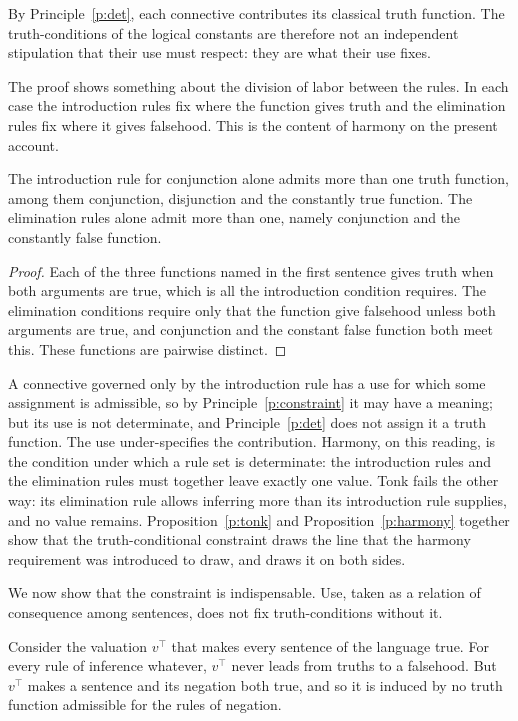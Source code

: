 \documentclass{situationist-preprint}
\begin{document}
By Principle~\ref{p:det}, each connective contributes its classical truth function. The truth-conditions of the logical constants are therefore not an independent stipulation that their use must respect: they are what their use fixes.

The proof shows something about the division of labor between the rules. In each case the introduction rules fix where the function gives truth and the elimination rules fix where it gives falsehood. This is the content of harmony on the present account.

\begin{proposition}[Harmony]\label{p:harmony}
The introduction rule for conjunction alone admits more than one truth function, among them conjunction, disjunction and the constantly true function. The elimination rules alone admit more than one, namely conjunction and the constantly false function.
\end{proposition}

\begin{proof}
Each of the three functions named in the first sentence gives truth when both arguments are true, which is all the introduction condition requires. The elimination conditions require only that the function give falsehood unless both arguments are true, and conjunction and the constant false function both meet this. These functions are pairwise distinct.
\end{proof}

A connective governed only by the introduction rule has a use for which some assignment is admissible, so by Principle~\ref{p:constraint} it may have a meaning; but its use is not determinate, and Principle~\ref{p:det} does not assign it a truth function. The use under-specifies the contribution. Harmony, on this reading, is the condition under which a rule set is determinate: the introduction rules and the elimination rules must together leave exactly one value. Tonk fails the other way: its elimination rule allows inferring more than its introduction rule supplies, and no value remains. Proposition~\ref{p:tonk} and Proposition~\ref{p:harmony} together show that the truth-conditional constraint draws the line that the harmony requirement was introduced to draw, and draws it on both sides.

We now show that the constraint is indispensable. Use, taken as a relation of consequence among sentences, does not fix truth-conditions without it.

\begin{proposition}\label{p:carnap}
Consider the valuation $v^\top$ that makes every sentence of the language true. For every rule of inference whatever, $v^\top$ never leads from truths to a falsehood. But $v^\top$ makes a sentence and its negation both true, and so it is induced by no truth function admissible for the rules of negation.
\end{proposition}
\end{document}
